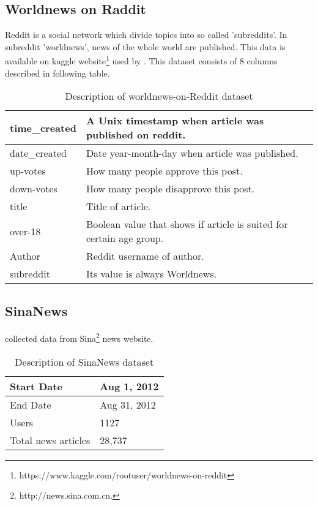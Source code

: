 \subsection{Worldnews on Raddit}
Reddit is a social network which divide topics into so called 'subreddits'. In subreddit 'worldnews', news of the whole world are published. This data is available on kaggle website\footnote{https://www.kaggle.com/rootuser/worldnews-on-reddit} used by \cite{N10}. This dataset consists of 8 columns described in following table.
\\
\begin{table}[!htbp] 
\centering
\footnotesize
\def\arraystretch{1.4}%
\centering
\begin{tabular}{|p{2cm}|p{8cm}|}
\hline
time\_created & A Unix timestamp when article was published on reddit.
\\
\hline 
date\_created & Date year-month-day when article was published.
\\
\hline 
up-votes & How many people approve this post. 
\\
\hline 
down-votes & How many people disapprove this post.
\\
\hline
title & Title of article.
\\
\hline
over-18 & Boolean value that shows if article is suited for certain age group.
\\
\hline 
Author & Reddit username of author.
\\
\hline 
subreddit & Its value is always Worldnews.
\\
\hline
\end{tabular}

\caption{Description of worldnews-on-Reddit dataset}
\label{table:8}
\end{table}
\subsection{SinaNews}
\cite{p4-8} collected data from Sina\footnote{http://news.sina.com.cn.} news website.
\\
\begin{table}[!htbp] 
\centering
\footnotesize
\def\arraystretch{1.4}%
\centering
\begin{tabular}{|p{6cm}|p{4cm}|}
\hline
Start Date & Aug 1, 2012
\\
\hline 
End Date &  Aug 31, 2012
\\
\hline 
Users & 1127 
\\
\hline 
 Total news articles & 28,737
\\
\hline
\end{tabular}

\caption{Description of SinaNews dataset}
\label{table:8}
\end{table}
